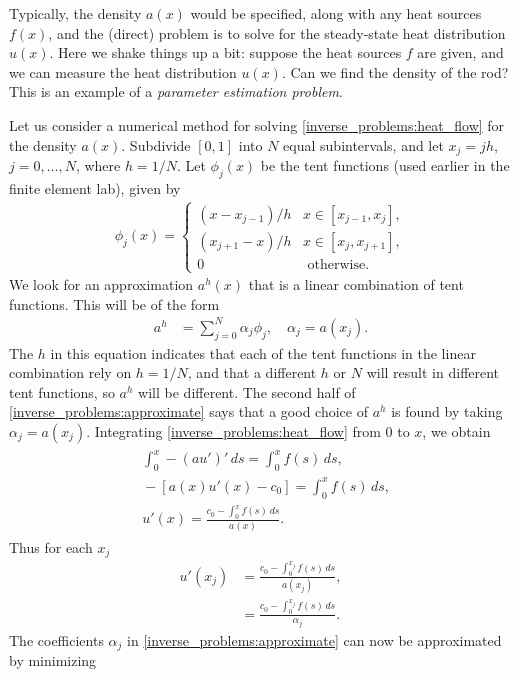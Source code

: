 Typically, the density $a(x)$ would be specified, along with any heat sources $f(x)$, and the (direct) problem is to solve for the steady-state heat distribution $u(x)$.
Here we shake things up a bit: suppose the heat sources $f$ are given, and we can measure the heat distribution $u(x)$.
Can we find the density of the rod?
This is an example of a \textit{parameter estimation problem}.

Let us consider a numerical method for solving \eqref{inverse_problems:heat_flow} for the density $a(x)$.
Subdivide $[0,1]$ into $N$ equal subintervals, and let $x_j = jh$, $j = 0, \ldots,N$, where $h = 1/N$.
Let $\phi_j(x)$ be the tent functions (used earlier in the finite element lab), given by 
\begin{align*}
	\phi_j(x) = \begin{cases}
(x - x_{j-1})/h  &  x \in [x_{j-1},x_j],\\
 (x_{j+1} - x)/h  &  x \in [x_{j},x_{j+1}],\\
0 & \text{ otherwise.}
\end{cases}
\end{align*}
We look for an approximation $a^h(x)$ that is a linear combination of tent functions. This will be of the form 
\begin{align}
	a^h &= \sum_{j=0}^N \alpha_j \phi_j, \quad \alpha_j=a(x_j).
\label{inverse_problems:approximate}
\end{align}
The $h$ in this equation indicates that each of the tent functions in the linear combination rely on $h= 1/N$, and that a different $h$ or $N$ will result in different tent functions, so $a^h$ will be different. 
The second half of \eqref{inverse_problems:approximate} says that a good choice of $a^h$ is found by taking $\alpha_j = a(x_j)$.
Integrating \eqref{inverse_problems:heat_flow} from $0$ to $x$, we obtain
\begin{align}
\begin{split}
&{} \int_0^x -(au')'\, ds = \int_0^x f(s)\, ds,\\
&{} -[a(x)u'(x) - c_0] = \int_0^x f(s)\, ds,\\
&{} u'(x) = \frac{c_0 - \int_0^x f(s)\, ds}{a(x)}.
\end{split}
\end{align}
Thus for each $x_j$
\begin{align*}
	u'(x_j) &= \frac{c_0 - \int_0^{x_j} f(s)\, ds}{a(x_j)},\\
	&= \frac{c_0 - \int_0^{x_j} f(s)\, ds}{\alpha_j}.
\end{align*}
The coefficients $\alpha_j$ in \eqref{inverse_problems:approximate} can now be approximated by minimizing 
